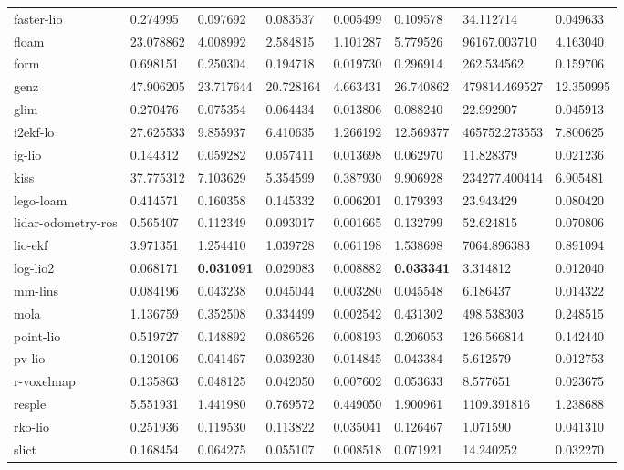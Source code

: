 \begin{table}[]
{\begin{tabular}{llllllll}
		faster-lio & 0.274995 & 0.097692 & 0.083537 & 0.005499 & 0.109578 & 34.112714 & 0.049633 \\
		floam & 23.078862 & 4.008992 & 2.584815 & 1.101287 & 5.779526 & 96167.003710 & 4.163040 \\
		form & 0.698151 & 0.250304 & 0.194718 & 0.019730 & 0.296914 & 262.534562 & 0.159706 \\
		genz & 47.906205 & 23.717644 & 20.728164 & 4.663431 & 26.740862 & 479814.469527 & 12.350995 \\
		glim & 0.270476 & 0.075354 & 0.064434 & 0.013806 & 0.088240 & 22.992907 & 0.045913 \\
		i2ekf-lo & 27.625533 & 9.855937 & 6.410635 & 1.266192 & 12.569377 & 465752.273553 & 7.800625 \\
		ig-lio & 0.144312 & 0.059282 & 0.057411 & 0.013698 & 0.062970 & 11.828379 & 0.021236 \\
		kiss & 37.775312 & 7.103629 & 5.354599 & 0.387930 & 9.906928 & 234277.400414 & 6.905481 \\
		lego-loam & 0.414571 & 0.160358 & 0.145332 & 0.006201 & 0.179393 & 23.943429 & 0.080420 \\
		lidar-odometry-ros & 0.565407 & 0.112349 & 0.093017 & 0.001665 & 0.132799 & 52.624815 & 0.070806 \\
		lio-ekf & 3.971351 & 1.254410 & 1.039728 & 0.061198 & 1.538698 & 7064.896383 & 0.891094 \\
		log-lio2 & 0.068171 & \textbf{0.031091} & 0.029083 & 0.008882 & \textbf{0.033341} & 3.314812 & 0.012040 \\
		mm-lins & 0.084196 & 0.043238 & 0.045044 & 0.003280 & 0.045548 & 6.186437 & 0.014322 \\
		mola & 1.136759 & 0.352508 & 0.334499 & 0.002542 & 0.431302 & 498.538303 & 0.248515 \\
		point-lio & 0.519727 & 0.148892 & 0.086526 & 0.008193 & 0.206053 & 126.566814 & 0.142440 \\
		pv-lio & 0.120106 & 0.041467 & 0.039230 & 0.014845 & 0.043384 & 5.612579 & 0.012753 \\
		r-voxelmap & 0.135863 & 0.048125 & 0.042050 & 0.007602 & 0.053633 & 8.577651 & 0.023675 \\
		resple & 5.551931 & 1.441980 & 0.769572 & 0.449050 & 1.900961 & 1109.391816 & 1.238688 \\
		rko-lio & 0.251936 & 0.119530 & 0.113822 & 0.035041 & 0.126467 & 1.071590 & 0.041310 \\
		slict & 0.168454 & 0.064275 & 0.055107 & 0.008518 & 0.071921 & 14.240252 & 0.032270 \\

\end{tabular}}
\end{table}
